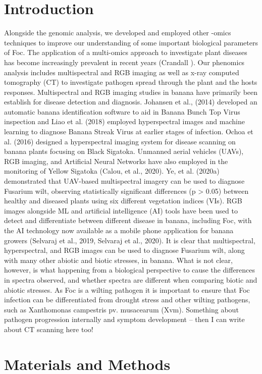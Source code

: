\section{Introduction}
Alongside the genomic analysis, we developed and employed other -omics techniques to improve our understanding of some important biological parameters of Foc. The application of  a multi-omics approach to investigate plant diseases has become increasingly prevalent in recent years (Crandall ). Our phenomics analysis includes multispectral and RGB imaging as well as x-ray computed tomography (CT) to investigate pathogen spread through the plant and the hosts responses. 
Multispectral and RGB imaging studies in banana have primarily been establish for disease detection and diagnosis. Johansen et al., (2014) developed an automatic banana identification software to aid in Banana Bunch Top Virus inspection and Liao et al. (2018) employed hyperspectral images and machine learning to diagnose Banana Streak Virus at earlier stages of infection. Ochoa et al. (2016) designed a hyperspectral imaging system for disease scanning on banana plants focusing on Black Sigatoka. Unmanned aerial vehicles (UAVs), RGB imaging, and Artificial Neural Networks have also employed in the monitoring of Yellow Sigatoka (Calou, et al., 2020). Ye, et al. (2020a) demonstrated that UAV-based multispectral imagery can be used to diagnose Fusarium wilt, observing statistically significant differences (p > 0.05) between healthy and diseased plants using six different vegetation indices (VIs). RGB images alongside ML and artificial intelligence (AI) tools have been used to detect and differentiate between different disease in banana, including Foc, with the AI technology now available as a mobile phone application for banana growers (Selvaraj et al., 2019, Selvaraj et al., 2020).
It is clear that multispectral, hyperspectral, and RGB images can be used to diagnose Fusarium wilt, along with many other abiotic and biotic stresses, in banana. What is not clear, however, is what happening from a biological perspective to cause the differences in spectra observed, and whether spectra are different when comparing biotic and abiotic stresses. As Foc is a wilting pathogen it is important to ensure that Foc infection can be differentiated from drought stress and other wilting pathogens, such as Xanthomonas campestris pv. musacearum (Xvm). 
Something about pathogen progression internally and symptom development – then I can write about CT scanning here too! 

\section{Materials and Methods}\label{sec:Chapter4_MM}
